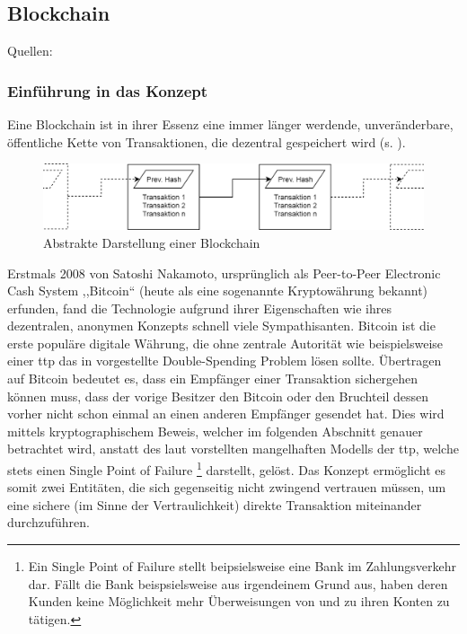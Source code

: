 \subsection{Blockchain}
\label{sec:sota_blockchain}

    Quellen: \cite{Dorri2016}\cite{Conoscenti2016}\cite{Greenspan2015}\cite{ISO307}\cite{Kshetri2017}\cite{Nakamoto2008}\cite{Underwood2016}\cite{Vukolic2016}\cite{Vukolic2017}\cite{Wuest2017}\cite{Zheng2017}
    
    \subsubsection{Einführung in das Konzept}
    \label{sec:sota_blockchain_introduction}
    Eine Blockchain ist in ihrer Essenz eine immer länger werdende, unveränderbare, öffentliche Kette von Transaktionen, die dezentral gespeichert wird (s. ). 
    
    \begin{figure}[H]
    	\centering
    	\includegraphics[width=\textwidth]{graphics/bc_highlvl.png}
    	\caption{Abstrakte Darstellung einer Blockchain}
    	\label{fig:bc_highlvl}
    \end{figure}
    \noindent Erstmals 2008 von Satoshi Nakamoto, ursprünglich als Peer-to-Peer Electronic Cash System ,,Bitcoin`` (heute als eine sogenannte Kryptowährung bekannt) erfunden, fand die Technologie aufgrund ihrer Eigenschaften wie ihres dezentralen, anonymen Konzepts schnell viele Sympathisanten. 
    Bitcoin ist die erste populäre digitale Währung, die ohne zentrale Autorität wie beispielsweise einer \gls{ttp} das in  vorgestellte Double-Spending Problem lösen sollte\cite{Nakamoto2008}. 
    Übertragen auf Bitcoin bedeutet es, dass ein Empfänger einer Transaktion sichergehen können muss, dass der vorige Besitzer den Bitcoin oder den Bruchteil dessen vorher nicht schon einmal an einen anderen Empfänger gesendet hat.
    Dies wird mittels kryptographischem Beweis, welcher im folgenden Abschnitt genauer betrachtet wird, anstatt des laut \citeauthor{Nakamoto2008} vorstellten mangelhaften Modells der \gls{ttp}, welche stets einen Single Point of Failure
    \!\footnote{Ein Single Point of Failure stellt beipsielsweise eine Bank im Zahlungsverkehr dar.
    Fällt die Bank beispsielsweise aus irgendeinem Grund aus, haben deren Kunden keine Möglichkeit mehr Überweisungen von und zu ihren Konten zu tätigen.}
    darstellt, gelöst. 
    Das Konzept ermöglicht es somit zwei Entitäten, die sich gegenseitig nicht zwingend vertrauen müssen, um eine sichere (im Sinne der Vertraulichkeit) direkte Transaktion miteinander durchzuführen.
    
